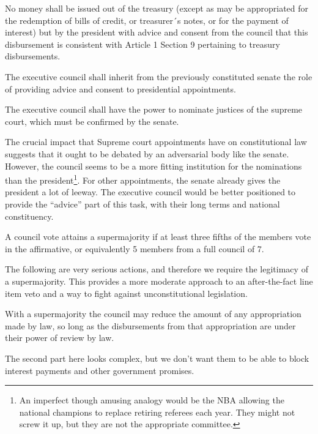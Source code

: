 \documentclass{article}
\begin{document}
\begin{quoting}
No money shall be issued out of the treasury (except as may be appropriated for the redemption of bills of credit, or treasurer´s notes, or for the payment of interest) but by the president with advice and consent from the council that this disbursement is consistent with Article 1 Section 9 pertaining to treasury disbursements.

The executive council shall inherit from the previously constituted senate the role of providing advice and consent to presidential appointments.

The executive council shall have the power to nominate justices of the supreme court, which must be confirmed by the senate.
\end{quoting}

The crucial impact that Supreme court appointments have on constitutional law suggests that it ought to be debated by an adversarial body like the senate. However, the council seems to be a more fitting institution for the nominations than the president\footnote{An imperfect though amusing analogy would be the NBA allowing the national champions to replace retiring referees each year. They might not screw it up, but they are not the appropriate committee.}. For other appointments, the senate already gives the president a lot of leeway. The executive council would be better positioned to provide the “advice” part of this task, with their long terms and national constituency.

\begin{quoting}
A council vote attains a supermajority if at least three fifths of the members vote in the affirmative, or equivalently 5 members from a full council of 7.
\end{quoting}

The following are very serious actions, and therefore we require the legitimacy of a supermajority. This provides a more moderate approach to an after-the-fact line item veto and a way to fight against unconstitutional legislation.

\begin{quoting}
With a supermajority the council may reduce the amount of any appropriation made by law, so long as the disbursements from that appropriation are under their power of review by law.
\end{quoting}

The second part here looks complex, but we don’t want them to be able to block interest payments and other government promises.
\end{document}
